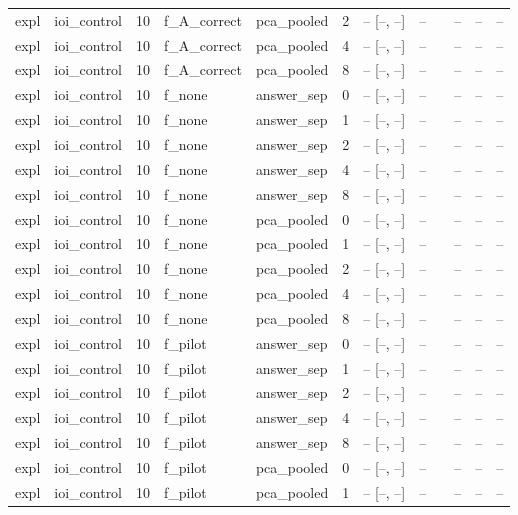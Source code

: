 \begin{tabular}{llrllrrrlrrr}
expl & ioi\_control & 10 & f\_A\_correct & pca\_pooled & 2 & -- [--, --] & -- &  & -- & -- & -- \\
expl & ioi\_control & 10 & f\_A\_correct & pca\_pooled & 4 & -- [--, --] & -- &  & -- & -- & -- \\
expl & ioi\_control & 10 & f\_A\_correct & pca\_pooled & 8 & -- [--, --] & -- &  & -- & -- & -- \\
expl & ioi\_control & 10 & f\_none & answer\_sep & 0 & -- [--, --] & -- &  & -- & -- & -- \\
expl & ioi\_control & 10 & f\_none & answer\_sep & 1 & -- [--, --] & -- &  & -- & -- & -- \\
expl & ioi\_control & 10 & f\_none & answer\_sep & 2 & -- [--, --] & -- &  & -- & -- & -- \\
expl & ioi\_control & 10 & f\_none & answer\_sep & 4 & -- [--, --] & -- &  & -- & -- & -- \\
expl & ioi\_control & 10 & f\_none & answer\_sep & 8 & -- [--, --] & -- &  & -- & -- & -- \\
expl & ioi\_control & 10 & f\_none & pca\_pooled & 0 & -- [--, --] & -- &  & -- & -- & -- \\
expl & ioi\_control & 10 & f\_none & pca\_pooled & 1 & -- [--, --] & -- &  & -- & -- & -- \\
expl & ioi\_control & 10 & f\_none & pca\_pooled & 2 & -- [--, --] & -- &  & -- & -- & -- \\
expl & ioi\_control & 10 & f\_none & pca\_pooled & 4 & -- [--, --] & -- &  & -- & -- & -- \\
expl & ioi\_control & 10 & f\_none & pca\_pooled & 8 & -- [--, --] & -- &  & -- & -- & -- \\
expl & ioi\_control & 10 & f\_pilot & answer\_sep & 0 & -- [--, --] & -- &  & -- & -- & -- \\
expl & ioi\_control & 10 & f\_pilot & answer\_sep & 1 & -- [--, --] & -- &  & -- & -- & -- \\
expl & ioi\_control & 10 & f\_pilot & answer\_sep & 2 & -- [--, --] & -- &  & -- & -- & -- \\
expl & ioi\_control & 10 & f\_pilot & answer\_sep & 4 & -- [--, --] & -- &  & -- & -- & -- \\
expl & ioi\_control & 10 & f\_pilot & answer\_sep & 8 & -- [--, --] & -- &  & -- & -- & -- \\
expl & ioi\_control & 10 & f\_pilot & pca\_pooled & 0 & -- [--, --] & -- &  & -- & -- & -- \\
expl & ioi\_control & 10 & f\_pilot & pca\_pooled & 1 & -- [--, --] & -- &  & -- & -- & -- \\

\end{tabular}
